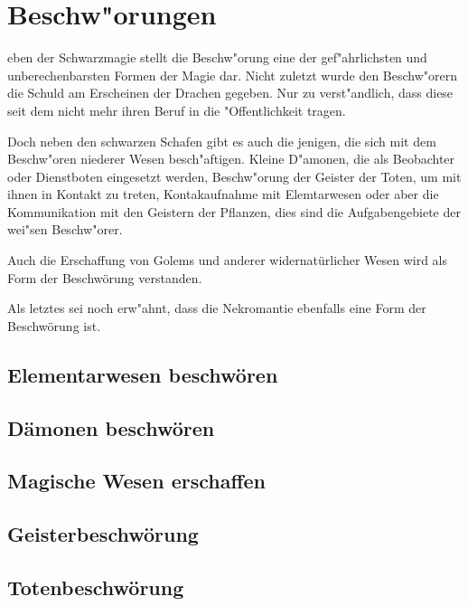 \section{Beschw"orungen}
\label{beschwoerungen}
eben der
Schwarzmagie stellt die Beschw"orung eine der gef"ahrlichsten und
unberechenbarsten Formen der Magie dar. Nicht zuletzt wurde den
Beschw"orern die Schuld am Erscheinen der Drachen gegeben. Nur zu
verst"andlich, dass diese seit dem nicht mehr ihren Beruf in die
"Offentlichkeit tragen.
\par Doch neben den schwarzen Schafen gibt es auch die jenigen,
die sich mit dem Beschw"oren niederer Wesen besch"aftigen. Kleine
D"amonen, die als Beobachter oder Dienstboten eingesetzt werden,
Beschw"orung der Geister der Toten, um mit ihnen in Kontakt zu
treten, Kontakaufnahme mit Elemtarwesen oder aber die Kommunikation
mit den Geistern der Pflanzen, dies sind die Aufgabengebiete der
wei"sen Beschw"orer.
\par Auch die Erschaffung von Golems und anderer widernatürlicher
Wesen wird als Form der Beschwörung verstanden.
\par Als letztes sei noch erw"ahnt, dass die Nekromantie ebenfalls
eine Form der Beschwörung ist.

\subsection{Elementarwesen beschwören}
\subsection{Dämonen beschwören}
\subsection{Magische Wesen erschaffen}
\subsection{Geisterbeschwörung}
\subsection{Totenbeschwörung}
